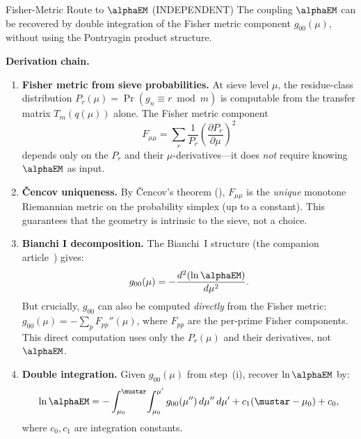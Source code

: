 \documentclass[12pt,a4paper]{article}
\begin{document}
\begin{derbox}{Fisher-Metric Route to $\alphaEM$ (INDEPENDENT)}
\label{der:fisher_route}
The coupling $\alphaEM$ can be recovered by double integration of the
Fisher metric component $g_{00}(\mu)$, without using the Pontryagin
product structure.

\medskip\noindent\textbf{Derivation chain.}

\begin{enumerate}[leftmargin=*, label=\textbf{(\roman*)}]
\item \textbf{Fisher metric from sieve probabilities.}
  At sieve level $\mu$, the residue-class distribution
  $P_r(\mu) = \Pr(g_n \equiv r \bmod m)$ is computable from the
  transfer matrix $T_m(q(\mu))$ alone. The Fisher metric component
  \begin{equation}
    F_{\mu\mu} = \sum_r \frac{1}{P_r}\left(\frac{\partial P_r}{\partial\mu}\right)^2
    \label{eq:fisher_component}
  \end{equation}
  depends only on the $P_r$ and their $\mu$-derivatives---it does
  \emph{not} require knowing $\alphaEM$ as input.

\item \textbf{\v{C}encov uniqueness.}
  By \v{C}encov's theorem (\cite{companion_M2}), $F_{\mu\mu}$ is the
  \emph{unique} monotone Riemannian metric on the probability simplex
  (up to a constant). This guarantees that the geometry is intrinsic
  to the sieve, not a choice.

\item \textbf{Bianchi I decomposition.}
  The Bianchi~I structure (the companion article~\cite{companion_physics}) gives:
  \begin{equation}
    g_{00}(\mu) = -\frac{d^2(\ln\alphaEM)}{d\mu^2}.
    \label{eq:g00_def}
  \end{equation}
  But crucially, $g_{00}$ can also be computed \emph{directly}
  from the Fisher metric: $g_{00}(\mu) = -\sum_p F_{pp}''(\mu)$,
  where $F_{pp}$ are the per-prime Fisher components. This direct
  computation uses only the $P_r(\mu)$ and their derivatives, not
  $\alphaEM$.

\item \textbf{Double integration.}
  Given $g_{00}(\mu)$ from step~(i), recover $\ln\alphaEM$ by:
  \begin{equation}
    \ln\alphaEM = -\int_{\mu_0}^{\mustar}\!\int_{\mu_0}^{\mu'}
    g_{00}(\mu'')\,d\mu''\,d\mu' + c_1(\mustar - \mu_0) + c_0,
    \label{eq:fisher_inversion}
  \end{equation}
  where $c_0, c_1$ are integration constants.


\end{enumerate}
\end{derbox}
\end{document}
